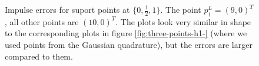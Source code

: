 \begin{figure}[h!]
\caption{Impulse errors for suport points at $\{0, \frac{1}{2}, 1\}$. The point $p_1^L=(9,0)^T$, all other points are $(10,0)^T$. The plots look very similar in shape to the corresponding plots in figure \ref{fig:three-points-h1-} (where we used points from the Gaussian quadrature), but the errors are larger compared to them.}
\label{fig:equidist_3_alles_default_ausser_p1_9_0}
\end{figure}


